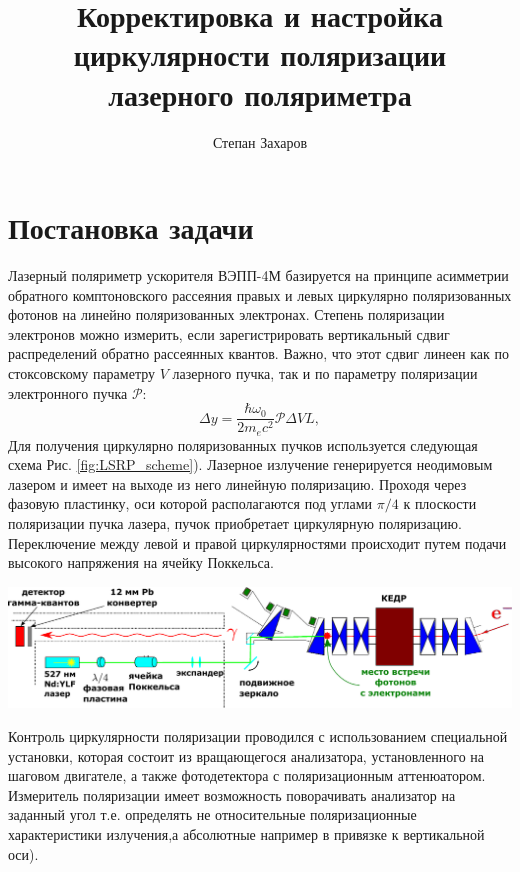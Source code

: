 \documentclass[12pt]{article}
\title{Корректировка и настройка циркулярности поляризации лазерного поляриметра}
\author{Степан Захаров}
\begin{document}
\maketitle

\vspace{-3em} 

\section{Постановка задачи}
Лазерный поляриметр ускорителя ВЭПП-4М базируется на принципе асимметрии обратного комптоновского рассеяния правых и левых циркулярно поляризованных фотонов на линейно поляризованных электронах. Степень поляризации электронов можно измерить, если зарегистрировать вертикальный сдвиг распределений обратно рассеянных квантов. Важно, что этот сдвиг линеен как по стоксовскому параметру $V$ лазерного пучка, так и по параметру поляризации электронного пучка $\mathcal{P}$:
\begin{equation}
\Delta y = \frac{\hbar \omega_0}{2 m_e c^2} \mathcal{P} \Delta V L,
\label{eq:pol_effect}
\end{equation}%
Для получения циркулярно поляризованных пучков используется следующая схема Рис. \ref{fig:LSRP_scheme}). Лазерное излучение генерируется неодимовым лазером и имеет на выходе из него линейную поляризацию. Проходя через фазовую пластинку, оси которой располагаются под углами $\pi/4$ к плоскости поляризации пучка лазера, пучок приобретает циркулярную поляризацию. Переключение между левой и правой циркулярностями происходит путем подачи высокого напряжения на ячейку Поккельса.
\begin{center}
	\includegraphics[width=16cm]{img/LSRP_scheme.pdf}
	\label{fig:LSRP_scheme}
\end{center}
Контроль циркулярности поляризации проводился с использованием специальной установки, которая состоит из вращающегося анализатора, установленного на шаговом двигателе, а также фотодетектора с поляризационным аттенюатором. Измеритель поляризации имеет возможность поворачивать анализатор на заданный угол т.е. определять не относительные поляризационные характеристики излучения,а абсолютные например в привязке к вертикальной оси).
\end{document}
